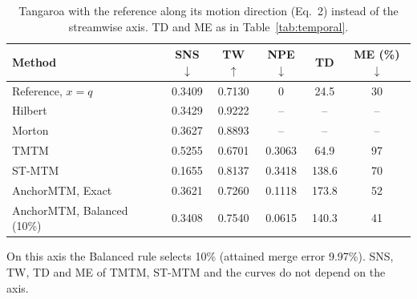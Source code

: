 \begin{table}[!h]
\centering
\caption{Tangaroa with the reference along its motion direction (Eq.~2) instead of the streamwise axis. TD and ME as in Table~\ref{tab:temporal}.}
\label{tab:tangaroa-motion}
\footnotesize
\setlength{\tabcolsep}{3pt}
\begin{tabular}{@{}lccccc@{}}
\toprule
Method & SNS$\downarrow$ & TW$\uparrow$ & NPE$\downarrow$ & TD & ME (\%)$\downarrow$ \\
\midrule
Reference, $x=q$ & 0.3409 & 0.7130 & 0 & 24.5 & 30 \\
Hilbert & 0.3429 & 0.9222 & -- & -- & -- \\
Morton & 0.3627 & 0.8893 & -- & -- & -- \\
TMTM & 0.5255 & 0.6701 & 0.3063 & 64.9 & 97 \\
ST-MTM & 0.1655 & 0.8137 & 0.3418 & 138.6 & 70 \\
AnchorMTM, Exact & 0.3621 & 0.7260 & 0.1118 & 173.8 & 52 \\
AnchorMTM, Balanced (10\%) & 0.3408 & 0.7540 & 0.0615 & 140.3 & 41 \\
\bottomrule
\end{tabular}
\vspace{2pt}
\begin{minipage}{0.94\columnwidth}\footnotesize On this axis the Balanced rule selects 10\% (attained merge error 9.97\%). SNS, TW, TD and ME of TMTM, ST-MTM and the curves do not depend on the axis.\end{minipage}
\end{table}
